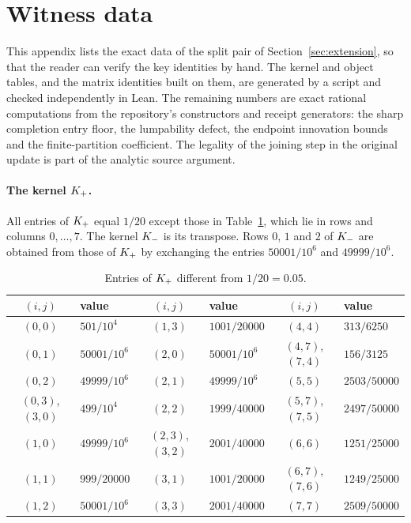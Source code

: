 \section{Witness data}\label{app:witness-data}

This appendix lists the exact data of the split pair of Section~\ref{sec:extension}, so that the reader can verify the key identities by hand. The kernel and object tables, and the matrix identities built on them, are generated by a script and checked independently in Lean. The remaining numbers are exact rational computations from the repository's constructors and receipt generators: the sharp completion entry floor, the lumpability defect, the endpoint innovation bounds and the finite-partition coefficient. The legality of the joining step in the original update is part of the analytic source argument.

\paragraph{The kernel $K_{+}$.}
All entries of $K_{+}$ equal $1/20$ except those in Table~\ref{tbl:warm-kernel}, which lie in rows and columns $0,\dots,7$. The kernel $K_{-}$ is its transpose. Rows $0$, $1$ and $2$ of $K_{-}$ are obtained from those of $K_{+}$ by exchanging the entries $50001/10^6$ and $49999/10^6$.

\begin{table}[h]
\caption{Entries of $K_{+}$ different from $1/20=0.05$.}
\label{tbl:warm-kernel}
\centering
\small
\begin{tabular}{@{}c l@{\qquad}c l@{\qquad}c l@{}}
\toprule
$(i,j)$ & value & $(i,j)$ & value & $(i,j)$ & value \\
\midrule
$(0,0)$ & $501/10^4$ & $(1,3)$ & $1001/20000$ & $(4,4)$ & $313/6250$ \\
$(0,1)$ & $50001/10^6$ & $(2,0)$ & $50001/10^6$ & $(4,7)$, $(7,4)$ & $156/3125$ \\
$(0,2)$ & $49999/10^6$ & $(2,1)$ & $49999/10^6$ & $(5,5)$ & $2503/50000$ \\
$(0,3)$, $(3,0)$ & $499/10^4$ & $(2,2)$ & $1999/40000$ & $(5,7)$, $(7,5)$ & $2497/50000$ \\
$(1,0)$ & $49999/10^6$ & $(2,3)$, $(3,2)$ & $2001/40000$ & $(6,6)$ & $1251/25000$ \\
$(1,1)$ & $999/20000$ & $(3,1)$ & $1001/20000$ & $(6,7)$, $(7,6)$ & $1249/25000$ \\
$(1,2)$ & $50001/10^6$ & $(3,3)$ & $2001/40000$ & $(7,7)$ & $2509/50000$ \\
\bottomrule
\end{tabular}
\end{table}

